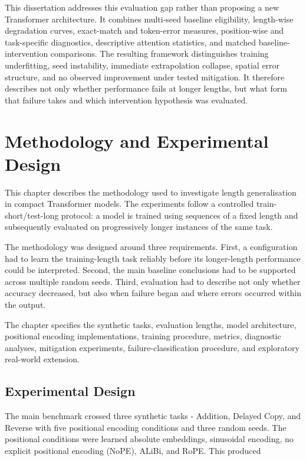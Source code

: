 \documentclass[
    author={Aanchala Ravindra Bhongade},
    supervisor={Dr. Fernando Moreno-Pino},
    degree={MSc},
    title={Length Generalisation in Transformer-Based Sequence Models: Failure Taxonomy and Mitigation Strategies},
    subtitle={},
    type={},
    year={2026}
]{dissertation}
\begin{document}
This dissertation addresses this evaluation gap rather than proposing a new Transformer architecture. It combines multi-seed baseline eligibility, length-wise degradation curves, exact-match and token-error measures, position-wise and task-specific diagnostics, descriptive attention statistics, and matched baseline-intervention comparisons. The resulting framework distinguishes training underfitting, seed instability, immediate extrapolation collapse, spatial error structure, and no observed improvement under tested mitigation. It therefore describes not only whether performance fails at longer lengths, but what form that failure takes and which intervention hypothesis was evaluated.

\chapter{Methodology and Experimental Design}
\label{chap:methodology}

\noindent
This chapter describes the methodology used to investigate length
generalisation in compact Transformer models. The experiments follow a controlled train-short/test-long protocol: a model is trained using sequences of a fixed length and subsequently evaluated on progressively longer instances of the same task.

The methodology was designed around three requirements. First, a configuration had to learn the training-length task reliably before its longer-length performance could be interpreted. Second, the main baseline conclusions had to be supported across multiple random seeds. Third, evaluation had to describe not only whether accuracy decreased, but also when failure began and where errors occurred within the output.

The chapter specifies the synthetic tasks, evaluation lengths, model
architecture, positional encoding implementations, training procedure, metrics, diagnostic analyses, mitigation experiments, failure-classification procedure, and exploratory real-world extension.

\section{Experimental Design}
\label{sec:experimental-design}

The main benchmark crossed three synthetic tasks - Addition, Delayed Copy, and Reverse with five positional encoding conditions and three random seeds. The positional conditions were learned absolute embeddings, sinusoidal encoding, no explicit positional encoding (NoPE), ALiBi, and RoPE. This produced
\end{document}
